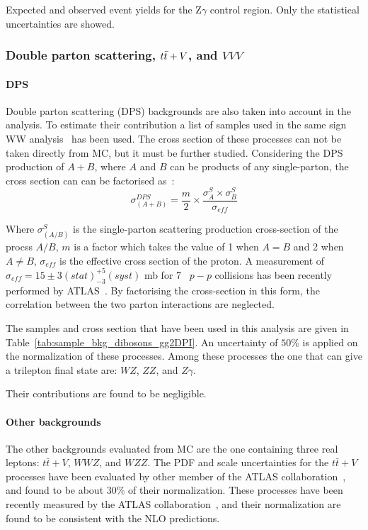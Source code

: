 \begin{table}[ht!]
\centering

\caption{Expected and observed event yields for the Z$\gamma$ control region. Only the statistical uncertainties are showed.}
\label{tab:Zgamma_CR}
\end{table}



\subsubsection{Double parton scattering, $t\bar{t} + V$, and $VVV$}

\paragraph{DPS}
\label{sec:bkg_DPS}
Double parton scattering (DPS) backgrounds are also taken into account in the analysis. To estimate their contribution a list of samples used in the same sign WW analysis~\cite{Aad:2014zda,DPS:Twiki} has been used. The cross section of these processes can not be taken directly from MC, but it must be further studied. Considering the DPS production of $A+B$, where $A$ and $B$ can be products of any single-parton, the cross section can can be factorised as~\cite{Gaunt:2010pi}:
\begin{equation}
	\sigma^{DPS}_{(A+B)}=\frac{m}{2}\times{}\frac{\sigma^{S}_{A}\times{}\sigma^{S}_{B}}{\sigma_{eff}}
\end{equation}	

Where $\sigma^{S}_{(A/B)}$ is the single-parton scattering production cross-section of the procss $A/B$, $m$ is a factor which takes the value of 1 when $A=B$ and 2 when $A\ne B$, $\sigma_{eff}$ is the effective cross section of the proton. A measurement of $\sigma_{eff} =15\pm3(stat)^{+5}_{-3}(syst)$ mb for 7~\TeV{} $p-p$ collisions has been recently performed by ATLAS~\cite{Aad:2013bjm}. By factorising the cross-section in this form, the correlation between the two parton interactions are neglected.

The samples and cross section that have been used in this analysis are given in Table~\ref{tab:sample_bkg_dibosons_gg2DPI}. An uncertainty of $50\%$ is applied on the normalization of these processes. Among these processes the one that can give a trilepton final state are: $WZ$, $ZZ$, and $Z\gamma$.
	
Their contributions are found to be negligible.


\paragraph{Other backgrounds}
The other backgrounds evaluated from MC are the one containing three real leptons: $t\bar{t}+V$, $WWZ$, and $WZZ$.
The PDF and scale uncertainties for the $t\bar{t}+V$ processes have been evaluated by other member of the ATLAS collaboration~\cite{ttV:Twiki}, and found
to be about $30\%$ of their normalization. These processes have been recently measured by the ATLAS collaboration~\cite{ATLAS-CONF-2015-032}, and their normalization are found to be consistent with the NLO predictions.

